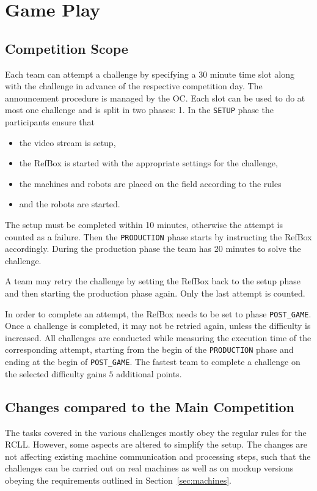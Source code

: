 \documentclass[12pt,twoside]{article}
\newcommand{\refsec}[1]{Section~\ref{#1}}
\begin{document}
\section{Game Play}
\subsection{Competition Scope}
Each team can attempt a challenge by specifying a 30 minute time slot along
with the challenge in advance of the respective competition day.
The announcement procedure is managed by the \ac{OC}.
Each slot can be used to do at most one challenge and is split in two phases:
1. In the \texttt{SETUP} phase the participants ensure that
\begin{itemize}
	\item the video stream is setup,
	\item the RefBox is started with the appropriate settings for the challenge,
	\item the machines and robots are placed on the field according to the rules
	\item and the robots are started.
\end{itemize}
The setup must be completed within 10 minutes, otherwise the attempt is counted
as a failure.
Then the \texttt{PRODUCTION} phase starts by instructing the RefBox accordingly.
During the production phase the team has 20 minutes to solve the challenge.

A team may retry the challenge by setting the RefBox back to the setup phase
and then starting the production phase again.
Only the last attempt is counted.

In order to complete an attempt, the RefBox needs to be set to phase
\texttt{POST\_GAME}.
Once a challenge is completed, it may not be retried again,
unless the difficulty is increased.
All challenges are conducted while measuring the execution time of the
corresponding attempt, starting from the begin of the \texttt{PRODUCTION} phase
and ending at the begin of \texttt{POST\_GAME}.
The fastest team to complete a challenge on the selected difficulty gains $5$
additional points.

\subsection{Changes compared to the Main Competition}
The tasks covered in the various challenges mostly obey the regular rules
for the \ac{RCLL}. However, some aspects are altered to simplify the setup.
The changes are not affecting existing machine communication and processing
steps, such that the challenges can be carried out on real machines as well as
on mockup versions obeying the requirements outlined in \refsec{sec:machines}.
\end{document}
